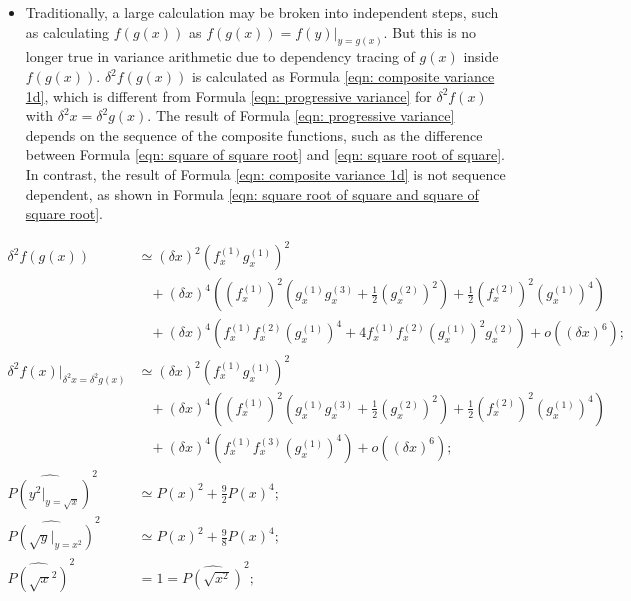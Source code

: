 \documentclass[twoside]{article}
\numberwithin{equation}{section}
\newcommand{\eqspace}{\;\;\;}
\begin{document}
\begin{itemize}
\item
Traditionally, a large calculation may be broken into independent steps, such as calculating $f(g(x))$ as $f(g(x)) = f(y)|_{y = g(x)}$.
But this is no longer true in variance arithmetic due to dependency tracing of $g(x)$ inside $f(g(x))$. 
$\delta^2 f(g(x))$ is calculated as Formula \eqref{eqn: composite variance 1d}, which is different from Formula \eqref{eqn: progressive variance} for $\delta^2 f(x)$ with $\delta^2 x = \delta^2 g(x)$.
The result of Formula \eqref{eqn: progressive variance} depends on the sequence of the composite functions, such as  the difference between Formula \eqref{eqn: square of square root} and \eqref{eqn: square root of square}.
In contrast, the result of Formula \eqref{eqn: composite variance 1d} is not sequence dependent, as shown in Formula \eqref{eqn: square root of square and square of square root}.

\end{itemize}

\begin{align}
\label{eqn: composite variance 1d}
\delta^2 f(g(x)) &\simeq (\delta x)^2 (f^{(1)}_x g^{(1)}_x)^2 \\
  &\eqspace + (\delta x)^4 \left( (f^{(1)}_x)^2 (g^{(1)}_x g^{(3)}_x + \frac{1}{2}(g^{(2)}_x)^2) + \frac{1}{2} (f^{(2)}_x)^2 (g^{(1)}_x)^4 \right) \nonumber \\
  &\eqspace + (\delta x)^4 \left( f^{(1)}_x f^{(2)}_x (g^{(1)}_x)^4 + 4 f^{(1)}_x f^{(2)}_x (g^{(1)}_x)^2 g^{(2)}_x \right) + o((\delta x)^6);  \nonumber\\
\label{eqn: progressive variance}
\delta^2 f(x)|_{\delta^2 x = \delta^2 g(x)} &\simeq (\delta x)^2 (f^{(1)}_x g^{(1)}_x)^2 \\
  &\eqspace + (\delta x)^4 \left( (f^{(1)}_x)^2 (g^{(1)}_x g^{(3)}_x + \frac{1}{2}(g^{(2)}_x)^2) + \frac{1}{2} (f^{(2)}_x)^2 (g^{(1)}_x)^4 \right) \nonumber \\
  &\eqspace + (\delta x)^4 \left( f^{(1)}_x f^{(3)}_x (g^{(1)}_x)^4 \right) + o((\delta x)^6);  \nonumber \\
\label{eqn: square of square root}
\widehat{P(y^2|_{y=\sqrt{x}})}^2 & \simeq P(x)^2 + \frac{9}{2} P(x)^4; \\
\label{eqn: square root of square}
\widehat{P(\sqrt{y}|_{y=x^2})}^2 & \simeq P(x)^2 + \frac{9}{8} P(x)^4; \\
\label{eqn: square root of square and square of square root}
\widehat{P(\sqrt{x}^2)}^2 &= 1 = \widehat{P(\sqrt{x^2})}^2;
\end{align}
\end{document}
